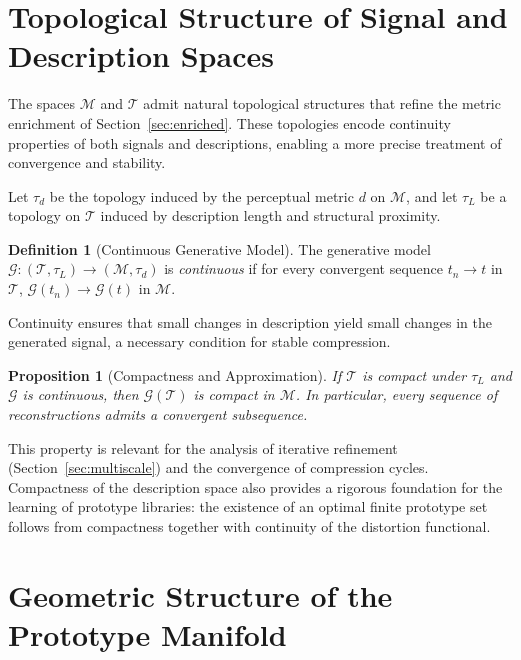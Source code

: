 \documentclass[11pt,a4paper]{article}
\newtheorem{proposition}[theorem]{Proposition}
\theoremstyle{definition}
\newtheorem{definition}[theorem]{Definition}
\theoremstyle{remark}
\begin{document}
\section{Topological Structure of Signal and Description Spaces}
\label{sec:topology}

The spaces $\mathcal{M}$ and $\mathcal{T}$ admit natural topological structures that refine the metric enrichment of Section~\ref{sec:enriched}. These topologies encode continuity properties of both signals and descriptions, enabling a more precise treatment of convergence and stability.

Let $\tau_d$ be the topology induced by the perceptual metric $d$ on $\mathcal{M}$, and let $\tau_L$ be a topology on $\mathcal{T}$ induced by description length and structural proximity.

\begin{definition}[Continuous Generative Model]
The generative model $\mathcal{G} : (\mathcal{T}, \tau_L) \to (\mathcal{M}, \tau_d)$ is \emph{continuous} if for every convergent sequence $t_n \to t$ in $\mathcal{T}$, $\mathcal{G}(t_n) \to \mathcal{G}(t)$ in $\mathcal{M}$.
\end{definition}

Continuity ensures that small changes in description yield small changes in the generated signal, a necessary condition for stable compression.

\begin{proposition}[Compactness and Approximation]
If $\mathcal{T}$ is compact under $\tau_L$ and $\mathcal{G}$ is continuous, then $\mathcal{G}(\mathcal{T})$ is compact in $\mathcal{M}$. In particular, every sequence of reconstructions admits a convergent subsequence.
\end{proposition}

This property is relevant for the analysis of iterative refinement (Section~\ref{sec:multiscale}) and the convergence of compression cycles. Compactness of the description space also provides a rigorous foundation for the learning of prototype libraries: the existence of an optimal finite prototype set follows from compactness together with continuity of the distortion functional.

\section{Geometric Structure of the Prototype Manifold}
\label{sec:geometry}
\end{document}

